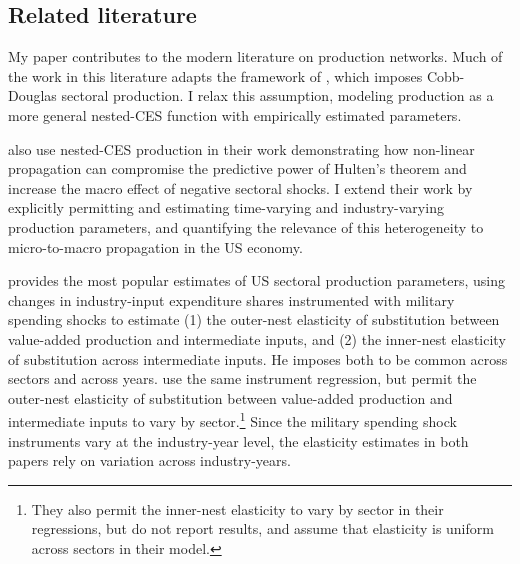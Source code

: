 \documentclass[11pt]{article}
\begin{document}
\subsection*{Related literature}

My paper contributes to the modern literature on production networks. Much of the work in this literature adapts the framework of \citet{acemogluNetworkOriginsAggregate2012}, which imposes Cobb-Douglas sectoral production. I relax this assumption, modeling production as a more general nested-CES function with empirically estimated parameters.

\citet{baqaeeMacroeconomicImpactMicroeconomic2019} also use nested-CES production in their work demonstrating how non-linear propagation can compromise the predictive power of Hulten's theorem and increase the macro effect of negative sectoral shocks. I extend their work by explicitly permitting and estimating time-varying and industry-varying production parameters, and quantifying the relevance of this heterogeneity to micro-to-macro propagation in the US economy.

\citet{atalayHowImportantAre2017} provides the most popular estimates of US sectoral production parameters, using changes in industry-input expenditure shares instrumented with military spending shocks to estimate (1) the outer-nest elasticity of substitution between value-added production and intermediate inputs, and (2) the inner-nest elasticity of substitution across intermediate inputs. He imposes both to be common across sectors and across years. \citet{miranda-pintoFlexibilityFrictionsMultisector2022} use the same instrument regression, but permit the outer-nest elasticity of substitution between value-added production and intermediate inputs to vary by sector.\footnote{They also permit the inner-nest elasticity to vary by sector in their regressions, but do not report results, and assume that elasticity is uniform across sectors in their model.} Since the military spending shock instruments vary at the industry-year level, the elasticity estimates in both papers rely on variation across industry-years.
\end{document}
